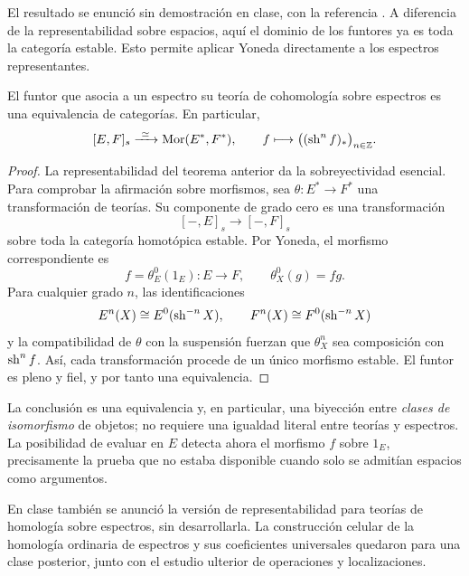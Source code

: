 El resultado se enunció sin demostración en clase, con la referencia \cite[teorema~4.3.11]{margolis1983}. A diferencia de la representabilidad sobre espacios, aquí el dominio de los funtores ya es toda la categoría estable. Esto permite aplicar Yoneda directamente a los espectros representantes.

\begin{prop}\label{prop:c20-yoneda-espectros}
El funtor que asocia a un espectro su teoría de cohomología sobre espectros es una equivalencia de categorías. En particular,
\[
[E,F]_s\xrightarrow{\ \simeq\ }\operatorname{Mor}(E^*,F^*),
\qquad f\longmapsto\bigl((\operatorname{sh}^nf)_*\bigr)_{n\in\mathbb Z}.
\]
\end{prop}
\begin{proof}
La representabilidad del teorema anterior da la sobreyectividad esencial. Para comprobar la afirmación sobre morfismos, sea $\theta\colon E^*\to F^*$ una transformación de teorías. Su componente de grado cero es una transformación
\[
[-,E]_s\longrightarrow[-,F]_s
\]
sobre toda la categoría homotópica estable. Por Yoneda, el morfismo correspondiente es
\[
f=\theta^0_E(1_E)\colon E\longrightarrow F,
\qquad\theta^0_X(g)=fg.
\]
Para cualquier grado $n$, las identificaciones
\[
E^n(X)\cong E^0(\operatorname{sh}^{-n}X),
\qquad F^n(X)\cong F^0(\operatorname{sh}^{-n}X)
\]
y la compatibilidad de $\theta$ con la suspensión fuerzan que $\theta^n_X$ sea composición con $\operatorname{sh}^nf$. Así, cada transformación procede de un único morfismo estable. El funtor es pleno y fiel, y por tanto una equivalencia.
\end{proof}

La conclusión es una equivalencia y, en particular, una biyección entre \emph{clases de isomorfismo} de objetos; no requiere una igualdad literal entre teorías y espectros. La posibilidad de evaluar en $E$ detecta ahora el morfismo $f$ sobre $1_E$, precisamente la prueba que no estaba disponible cuando solo se admitían espacios como argumentos.

En clase también se anunció la versión de representabilidad para teorías de homología sobre espectros, sin desarrollarla. La construcción celular de la homología ordinaria de espectros y sus coeficientes universales quedaron para una clase posterior, junto con el estudio ulterior de operaciones y localizaciones.
